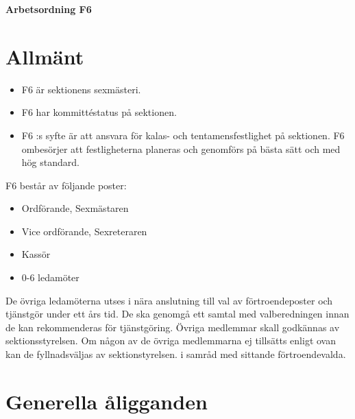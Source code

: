 \renewcommand{\dateseparator}{-} %

\renewcommand{\forening}{F6 }

\begin{center}
\LARGE{\textbf{Arbetsordning F6}}
\end{center}


\section{Allmänt}
\begin{itemize}

\item \forening är sektionens sexmästeri. 

\item \forening har kommittéstatus på sektionen.

\item \forening :s syfte är att ansvara för kalas- och tentamensfestlighet på sektionen. \forening ombesörjer att festligheterna planeras och genomförs på bästa sätt och med hög standard. 
\end{itemize}
\forening består av följande poster:
\begin{itemize}
\item Ordförande, Sexmästaren
\item Vice ordförande, Sexreteraren
\item Kassör
\item 0-6 ledamöter
\end{itemize}

De övriga ledamöterna utses i nära anslutning till val av förtroendeposter och tjänstgör under ett års tid. De ska genomgå ett samtal med valberedningen innan de kan rekommenderas för tjänstgöring. Övriga medlemmar skall godkännas av sektionsstyrelsen. Om någon av de övriga medlemmarna ej tillsätts enligt ovan kan de fyllnadsväljas av sektionstyrelsen. 
i samråd med sittande förtroendevalda.

\section{Generella åligganden}

